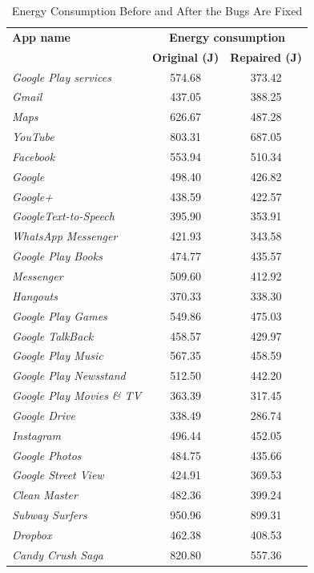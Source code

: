 \documentclass[sigconf,review, anonymous]{acmart}
\begin{document}
\begin{table}
\centering
\small
\caption{Energy Consumption Before and After the Bugs Are Fixed}
\begin{tabular}{|l|cc|}\hline
{\bf App name}&\multicolumn{2}{|c|}{\textbf{Energy consumption}}\\
& {\bf Original (J)}&{\bf Repaired (J)}\\
\hline
\hline
{\it Google Play services}&574.68&373.42\\
{\it Gmail}&437.05&388.25\\
{\it Maps}&626.67&487.28\\
{\it YouTube}&803.31&687.05\\
{\it Facebook}&553.94&510.34\\
{\it Google}&498.40&426.82\\
{\it Google+}&438.59&422.57\\
{\it GoogleText-to-Speech}&395.90&353.91\\
{\it WhatsApp Messenger}&421.93&343.58\\
{\it Google Play Books}&474.77&435.57\\
{\it Messenger}&509.60&412.92\\
{\it Hangouts}&370.33&338.30\\
{\it Google Play Games}&549.86&475.03\\
{\it Google TalkBack}&458.57&429.97\\
{\it Google Play Music}&567.35&458.59\\
{\it Google Play Newsstand}&512.50&442.20\\
{\it Google Play Movies \& TV}&363.39&317.45\\
{\it Google Drive}&338.49&286.74\\
{\it Instagram}&496.44&452.05\\
{\it Google Photos}&484.75&435.66\\
{\it Google Street View}&424.91&369.53\\
{\it Clean Master}&482.36&399.24\\
{\it Subway Surfers}&950.96&899.31\\
{\it Dropbox}&462.38&408.53\\
{\it Candy Crush Saga}&820.80&557.36\\

\end{tabular}
\end{table}
\end{document}

